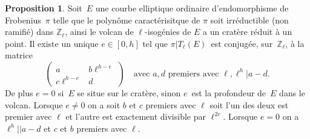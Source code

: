 \documentclass[10pt,a4paper]{book}
\theoremstyle{plain}
\theoremstyle{definition}
\theoremstyle{definition}
\theoremstyle{definition}
\newtheorem{prop}[thm]{Proposition}
\theoremstyle{definition}
\theoremstyle{remark}
\theoremstyle{remark}
\theoremstyle{definition}
\begin{document}
\begin{prop}\label{pro:mat:fro:atk}
Soit~$E$ une courbe elliptique ordinaire d'endomorphisme de Frobenius~$\pi$
telle que le polynôme caractérisitque de $\pi$
soit irréductible (non ramifié) dans $\mathbb{Z}_{\ell}$,
ainsi le volcan de $\ell$-isogénies de $E$ a un cratère réduit à un point.
Il existe un unique $e \in [ 0, h]$
tel que $\pi|T_{\ell}(E)$~est conjugée, sur~$\mathbb{Z}_{\ell}$,
à la matrice 
\begin{equation*}
\left ( \begin{matrix}a & b\ell^{h-e} \\ c\ell^{h-e} & d
\end{matrix}\right ) \quad \text{avec }a,d \text{ premiers avec }\ell, \ell^{h} |a-d.
\end{equation*}
De plus $e = 0$ si~$E$ se situe sur le cratère,
sinon $e$~est la profondeur de~$E$ dans le volcan.
Lorsque $e \neq 0$ on a soit $b$ et $c$ premiers avec $\ell$ soit l'un des deux est premier avec $\ell$ et l'autre est exactement divisible par $\ell^{2e}$.
Lorsque $e=0$ on a $\ell^{h} || a-d$ et $c$ et $b$ premiers avec $\ell$.
\end{prop}
\end{document}
